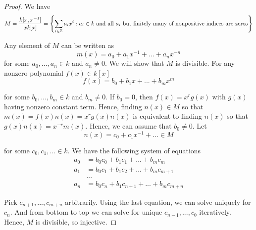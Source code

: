 \begin{proof}
	We have
	$$
		M = \frac{k[x, x^{-1}]}{x k[x]} =  \set*{\sum_{i \in \Z} a_i x^i: a_i \in k \text{ and all } a_i \text{ but finitely many of nonpositive indices are zeros}}
	$$
	
	Any element of $M$ can be written as
	$$
		m(x) = a_0 + a_1 x^{-1} + ... + a_n x^{-n}
	$$
	for some $a_0, ..., a_n \in k$ and $a_n \neq 0$. We will show that $M$ is divisible. For any nonzero polynomial $f(x) \in k[x]$
	$$
		f(x) = b_0 + b_1 x + ... + b_m x^m
	$$
	
	for some $b_0, ..., b_m \in k$ and $b_m \neq 0$. If $b_0 = 0$, then $f(x) = x^r g(x)$ with $g(x)$ having nonzero constant term. Hence, finding $n(x) \in M$ so that $m(x) = f(x) n(x) = x^r g(x) n(x)$ is equivalent to finding $n(x)$ so that $g(x) n(x) = x^{-r} m(x)$. Hence, we can assume that $b_0 \neq 0$. Let 
	$$
		n(x) = c_0 + c_1 x^{-1} + ... \in M
	$$
	
	for some $c_0, c_1, ... \in k$. We have the following system of equations
	\begin{align*}
		a_0 &= b_0 c_0 + b_1 c_1 + ... + b_m c_m \\
		a_1 &= b_0 c_1 + b_1 c_2 + ... + b_m c_{m+1} \\
				&... \\
		a_n &= b_0 c_n + b_1 c_{n+1} + ... + b_m c_{m+n}
	\end{align*}
	
	Pick $c_{n+1}, ..., c_{m+n}$ arbitrarily. Using the last equation, we can solve uniquely for $c_n$. And from bottom to top we can solve for unique $c_{n-1}, ..., c_0$ iteratively. Hence, $M$ is divisible, so injective.
	
	
\end{proof}
